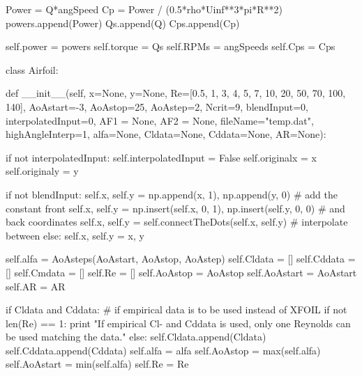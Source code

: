 \begin{pythoncode}
            Power = Q*angSpeed
            Cp = Power / (0.5*rho*Uinf**3*pi*R**2)
            powers.append(Power)
            Qs.append(Q)
            Cps.append(Cp)


        self.power = powers
        self.torque = Qs
        self.RPMs = angSpeeds
        self.Cps = Cps




class Airfoil:

    def __init__(self, x=None, y=None, Re=[0.5, 1, 3, 4, 5, 7, 10, 20, 50, 70, 100, 140], 
                             AoAstart=-3, 
                             AoAstop=25, 
                             AoAstep=2, 
                             Ncrit=9,
                             blendInput=0,
                             interpolatedInput=0,
                             AF1 = None,
                             AF2 = None,
                             fileName="temp.dat",
                             highAngleInterp=1,
                             alfa=None,
                             Cldata=None,
                             Cddata=None,
                             AR=None):

        if not interpolatedInput:
            self.interpolatedInput = False
            self.originalx = x
            self.originaly = y

            if not blendInput:
                self.x, self.y = np.append(x, 1), np.append(y, 0) # add the constant front
                self.x, self.y = np.insert(self.x, 0, 1), np.insert(self.y, 0, 0) # and back coordinates
                self.x, self.y = self.connectTheDots(self.x, self.y) # interpolate between
            else:
                self.x, self.y = x, y


            self.alfa = AoAsteps(AoAstart, AoAstop, AoAstep)
            self.Cldata = []
            self.Cddata = []
            self.Cmdata = []
            self.Re = []
            self.AoAstop = AoAstop
            self.AoAstart = AoAstart
            self.AR = AR

            if Cldata and Cddata: # if empirical data is to be used instead of XFOIL
                if not len(Re) == 1:
                    print "If empirical Cl- and Cddata is used, only one Reynolds can be used matching the data."
                else:
                    self.Cldata.append(Cldata)
                    self.Cddata.append(Cddata)
                    self.alfa = alfa
                    self.AoAstop = max(self.alfa)
                    self.AoAstart = min(self.alfa)
                    self.Re = Re


\end{pythoncode}
